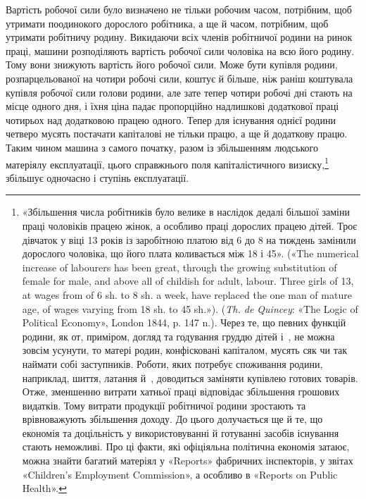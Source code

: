 Вартість робочої сили було визначено не тільки робочим
часом, потрібним, щоб утримати поодинокого дорослого робітника,
а ще й часом, потрібним, щоб утримати робітничу родину.
Викидаючи всіх членів робітничої родини на ринок праці, машини
розподіляють вартість робочої сили чоловіка на всю його родину.
Тому вони знижують вартість його робочої сили. Може бути купівля
родини, розпарцельованої на чотири робочі сили, коштує й
більше, ніж раніш коштувала купівля робочої сили голови родини,
але зате тепер чотири робочі дні стають на місце одного дня, і їхня
ціна падає пропорційно надлишкові додаткової праці чотирьох
над додатковою працею одного. Тепер для існування однієї родини
четверо мусять постачати капіталові не тільки працю, а ще й
додаткову працю. Таким чином машина з самого початку, разом
із збільшенням людського матеріялу експлуатації, цього справжнього
поля капіталістичного визиску,\footnote{
«Збільшення числа робітників було велике в наслідок дедалі
більшої заміни праці чоловіків працею жінок, а особливо праці дорослих
працею дітей. Троє дівчаток у віці 13 років із заробітною платою від 6
до 8 на тиждень замінили дорослого чоловіка, що його плата
коливається між 18 і 45». («The numerical increase of labourers
has been great, through the growing substitution of female for male, and
above all of childish for adult, labour. Three girls of 13, at wages from of
6 sh. to 8 sh. a week, have replaced the one man of mature age, of wages
varying from 18 sh. to 45 sh.»). (\emph{Th. de Quincey}: «The Logic of Political
Economy», London 1844, p. 147 n.). Через те, що певних функцій родини,
як от, приміром, догляд та годування груддю дітей і~, не можна зовсім
усунути, то матері родин, конфісковані капіталом, мусять сяк чи так наймати собі заступників. Роботи, яких потребує споживання родини,
наприклад, шиття, латання й~, доводиться заміняти купівлею готових
товарів. Отже, зменшенню витрати хатньої праці відповідає збільшення
грошових видатків. Тому витрати продукції робітничої родини зростають
та врівноважують збільшення доходу. До цього долучається ще й те, що
економія та доцільність у використовуванні й готуванні засобів існування
стають неможливі. Про ці факти, які офіціяльна політична економія
затаює, можна знайти багатий матеріял у «Reports» фабричних інспекторів,
у звітах «Children’s Employment Commission», а особливо в «Reports
on Public Health».
} збільшує одночасно і ступінь експлуатації.

